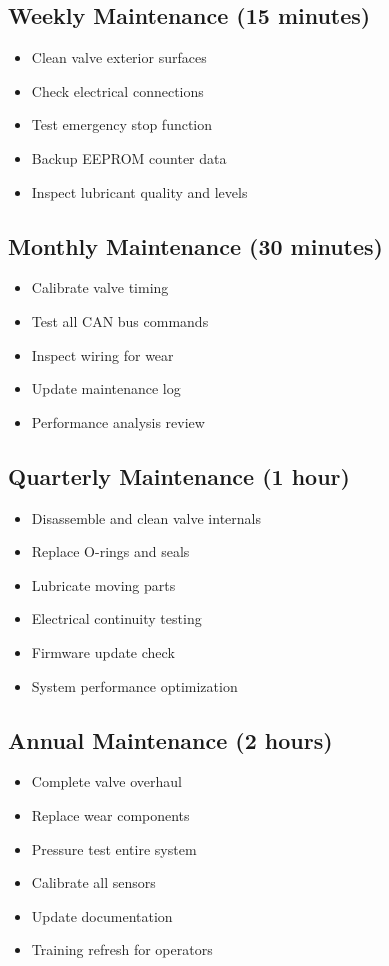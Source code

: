 \documentclass[11pt,a4paper]{article}
\begin{document}
\subsection{Weekly Maintenance (15 minutes)}
\begin{itemize}[label=$\square$]
    \item Clean valve exterior surfaces
    \item Check electrical connections
    \item Test emergency stop function
    \item Backup EEPROM counter data
    \item Inspect lubricant quality and levels
\end{itemize}

\subsection{Monthly Maintenance (30 minutes)}
\begin{itemize}[label=$\square$]
    \item Calibrate valve timing
    \item Test all CAN bus commands
    \item Inspect wiring for wear
    \item Update maintenance log
    \item Performance analysis review
\end{itemize}

\subsection{Quarterly Maintenance (1 hour)}
\begin{itemize}[label=$\square$]
    \item Disassemble and clean valve internals
    \item Replace O-rings and seals
    \item Lubricate moving parts
    \item Electrical continuity testing
    \item Firmware update check
    \item System performance optimization
\end{itemize}

\subsection{Annual Maintenance (2 hours)}
\begin{itemize}[label=$\square$]
    \item Complete valve overhaul
    \item Replace wear components
    \item Pressure test entire system
    \item Calibrate all sensors
    \item Update documentation
    \item Training refresh for operators
\end{itemize}
\end{document}
